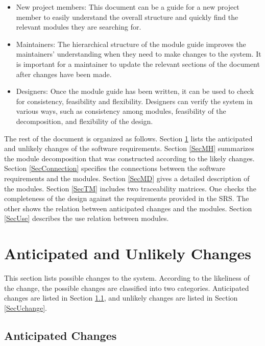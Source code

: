 \documentclass[12pt]{article}
\begin{document}
\begin{itemize}
\item New project members: This document can be a guide for a new project member
  to easily understand the overall structure and quickly find the
  relevant modules they are searching for.
\item Maintainers: The hierarchical structure of the module guide improves the
  maintainers' understanding when they need to make changes to the system. It is
  important for a maintainer to update the relevant sections of the document
  after changes have been made.
\item Designers: Once the module guide has been written, it can be used to
  check for consistency, feasibility and flexibility. Designers can verify the
  system in various ways, such as consistency among modules, feasibility of the
  decomposition, and flexibility of the design.
\end{itemize}

\noindent The rest of the document is organized as follows. Section
\ref{SecChange} lists the anticipated and unlikely changes of the software
requirements. Section \ref{SecMH} summarizes the module decomposition that
was constructed according to the likely changes. Section \ref{SecConnection}
specifies the connections between the software requirements and the
modules. Section \ref{SecMD} gives a detailed description of the
modules. Section \ref{SecTM} includes two traceability matrices. One checks
the completeness of the design against the requirements provided in the SRS. The
other shows the relation between anticipated changes and the modules. Section
\ref{SecUse} describes the use relation between modules.

\section{Anticipated and Unlikely Changes} \label{SecChange}

This section lists possible changes to the system. According to the likeliness
of the change, the possible changes are classified into two
categories. Anticipated changes are listed in Section \ref{SecAchange}, and
unlikely changes are listed in Section \ref{SecUchange}.

\subsection{Anticipated Changes} \label{SecAchange}
\end{document}
